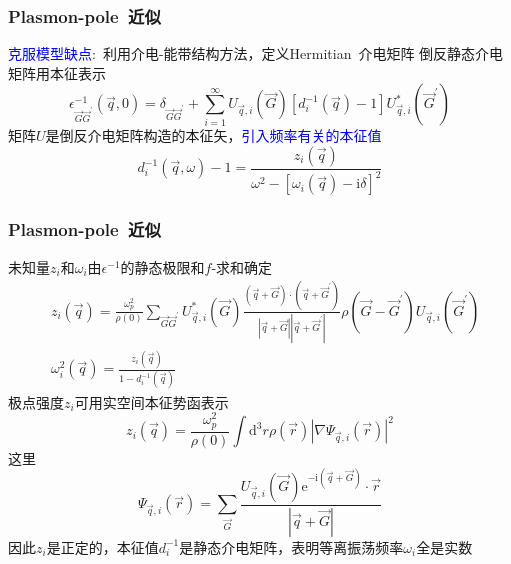 \documentclass[cjk,slidestop,compress,mathserif,blue]{beamer}
\begin{document}
\frame
{
	\frametitle{\textrm{Plasmon-pole~}近似}
	\textcolor{blue}{克服模型缺点}:~利用介电-能带结构方法，定义\textrm{Hermitian~}介电矩阵
	\fontsize{8.5pt}{6.2pt}
	倒反静态介电矩阵用本征表示
	\begin{displaymath}
		\epsilon_{\vec G\vec G^{\prime}}^{-1}(\vec q,0)=\delta_{\vec G\vec G^{\prime}}+\sum_{i=1}^{\infty}U_{\vec q,i}(\vec G)[d_i^{-1}(\vec q)-1]U_{\vec q,i}^{\ast}(\vec G^{\prime})
	\end{displaymath}
	矩阵$U$是倒反介电矩阵构造的本征矢，\textcolor{blue}{引入频率有关的本征值}
	\begin{displaymath}
		d_i^{-1}(\vec q,\omega)-1=\frac{z_i(\vec q)}{\omega^2-[\omega_i(\vec q)-\mathrm{i}\delta]^2}
	\end{displaymath}
}

\frame
{
	\frametitle{\textrm{Plasmon-pole~}近似}

	未知量$z_i$和$\omega_i$由$\epsilon^{-1}$的静态极限和$f$-求和确定
	\begin{displaymath}
		\begin{aligned}
			&z_i(\vec q)=\frac{\omega_p^2}{\rho(0)}\sum_{\vec G\vec G^{\prime}}U_{\vec q,i}^{\ast}(\vec G)\frac{(\vec q+\vec G)\cdot(\vec q+\vec G^{\prime})}{|\vec q+\vec G||\vec q+\vec G^{\prime}|}\rho(\vec G-\vec G^{\prime})U_{\vec q,i}(\vec G^{\prime})\\
			&\omega_i^2(\vec q)=\frac{z_i(\vec q)}{1-d_i^{-1}(\vec q)}
		\end{aligned}
	\end{displaymath}
	极点强度$z_i$可用实空间本征势函表示
	\begin{displaymath}
		z_i(\vec q)=\frac{\omega_p^2}{\rho(0)}\int\mathrm{d}^3r\rho(\vec r)|\nabla\Psi_{\vec q,i}(\vec r)|^2
	\end{displaymath}
	这里
	\begin{displaymath}
		\Psi_{\vec q,i}(\vec r)=\sum_{\vec G}\frac{U_{\vec q,i}(\vec G)\mathrm{e}^{-\mathrm{i}(\vec q+\vec G)}\cdot\vec r}{|\vec q+\vec G|}
	\end{displaymath}
	因此$z_i$是正定的，本征值$d_i^{-1}$是静态介电矩阵，表明等离振荡频率$\omega_i$全是实数
}
\end{document}
